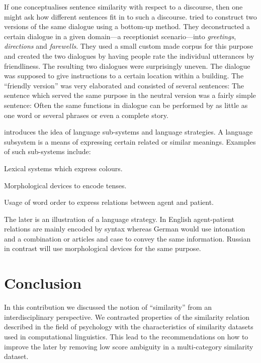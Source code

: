 \documentclass[11pt]{article}
\begin{document}
If one conceptualises sentence similarity with respect to a discourse, then one might ask how different sentences fit in to such a discourse.  tried to construct two versions of the same dialogue using a bottom-up method. They deconstructed a certain dialogue in a given domain---a receptionist scenario---into \textit{greetings}, \textit{directions} and \textit{farewells}. They used a small custom made corpus for this purpose and created the two dialogues by having people rate the individual utterances by friendliness. The resulting two dialogues were surprisingly uneven. The dialogue was supposed to give instructions to a certain location within a building. The ``friendly version'' was very elaborated and consisted of several sentences:
The sentence which served the same purpose in the neutral version was a fairly simple sentence:
Often the same functions in dialogue can be performed by as little as one word or several phrases or even a complete story. 

 introduces the idea of language sub-systems and language strategies. A language subsystem is a means of expressing certain related or similar meanings. Examples of such sub-systems include:
\begin{compactitem}
    \item Lexical systems which express colours.
    \item Morphological devices to encode tenses.
    \item Usage of word order to express relations between agent and patient.
\end{compactitem}  
The later is an illustration of a language strategy. In English agent-patient relations are mainly encoded by syntax whereas German would use intonation and a combination or articles and case to convey the same information. Russian in contrast will use morphological devices for the same purpose. 

\section{Conclusion}

In this contribution we discussed the notion of ``similarity'' from an interdisciplinary perspective. We contrasted properties of the similarity relation described in the field of psychology with the characteristics of similarity datasets used in computational linguistics. This lead to the recommendations on how to improve the later by removing low score ambiguity in a multi-category similarity dataset.
\end{document}
